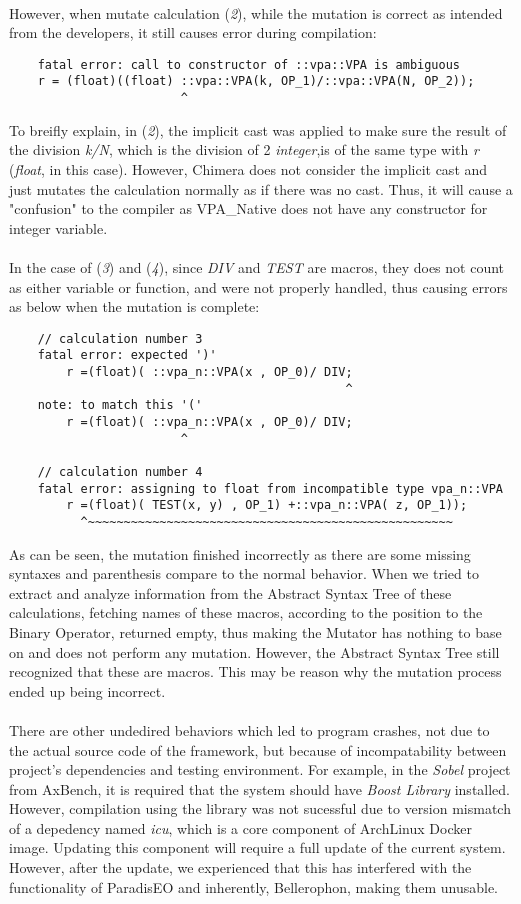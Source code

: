 ~\\
However, when mutate calculation (\textit{2}), while the mutation is correct as intended from the developers, it still causes error during compilation:
\begin{verbatim}
	fatal error: call to constructor of ::vpa::VPA is ambiguous
	r = (float)((float) ::vpa::VPA(k, OP_1)/::vpa::VPA(N, OP_2));
						^
\end{verbatim}
To breifly explain, in (\textit{2}), the implicit cast was applied to make sure the result of the division \textit{k/N}, which is the division of 2 \textit{integer},is of the same type with \textit{r} (\textit{float}, in this case). However, Chimera does not consider the implicit cast and just mutates the calculation normally as if there was no cast. Thus, it will cause a "confusion" to the compiler as VPA\_Native does not have any constructor for integer variable. \\
~\\
In the case of (\textit{3}) and (\textit{4}), since \textit{DIV} and \textit{TEST} are macros, they does not count as either variable or function, and were not properly handled, thus causing errors as below when the mutation is complete:
\begin{verbatim}
	// calculation number 3
	fatal error: expected ')'
        r =(float)( ::vpa_n::VPA(x , OP_0)/ DIV;
        									   ^
	note: to match this '('
        r =(float)( ::vpa_n::VPA(x , OP_0)/ DIV;
                        ^

	// calculation number 4
	fatal error: assigning to float from incompatible type vpa_n::VPA
        r =(float)( TEST(x, y) , OP_1) +::vpa_n::VPA( z, OP_1));
          ^~~~~~~~~~~~~~~~~~~~~~~~~~~~~~~~~~~~~~~~~~~~~~~~~~~~
\end{verbatim}
As can be seen, the mutation finished incorrectly as there are some missing syntaxes and parenthesis compare to the normal behavior. When we tried to extract and analyze information from the Abstract Syntax Tree of these calculations, fetching names of these macros, according to the position to the Binary Operator, returned empty, thus making the Mutator has nothing to base on and does not perform any mutation. However, the Abstract Syntax Tree still recognized that these are macros. This may be reason why the mutation process ended up being incorrect. \\
~\\
There are other undedired behaviors which led to program crashes, not due to the actual source code of the framework, but because of incompatability between project's dependencies and testing environment. For example, in the \textit{Sobel} project from AxBench, it is required that the system should have \textit{Boost Library} installed. However, compilation using the library was not sucessful due to version mismatch of a depedency named \textit{icu}, which is a core component of ArchLinux Docker image. Updating this component will require a full update of the current system. However, after the update, we experienced that this has interfered with the functionality of ParadisEO and inherently, Bellerophon, making them unusable. \\

